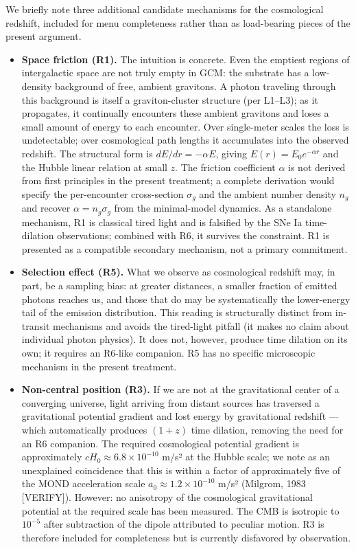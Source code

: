 \documentclass[12pt]{article}
\theoremstyle{definition}
\theoremstyle{remark}
\begin{document}
We briefly note three additional candidate mechanisms for the
cosmological redshift, included for menu completeness rather than as
load-bearing pieces of the present argument.

\begin{itemize}
\item
  \textbf{Space friction (R1).} The intuition is concrete. Even the
  emptiest regions of intergalactic space are not truly empty in GCM:
  the substrate has a low-density background of free, ambient gravitons.
  A photon traveling through this background is itself a graviton-cluster
  structure (per L1--L3); as it propagates, it continually encounters
  these ambient gravitons and loses a small amount of energy to each
  encounter. Over single-meter scales the loss is undetectable; over
  cosmological path lengths it accumulates into the observed redshift.
  The structural form is \(dE/dr = -\alpha E\), giving
  \(E(r) = E_0 e^{-\alpha r}\) and the Hubble linear relation at small
  \(z\). The friction coefficient \(\alpha\) is not derived from first
  principles in the present treatment; a complete derivation would
  specify the per-encounter cross-section \(\sigma_g\) and the ambient
  number density \(n_g\) and recover \(\alpha = n_g \sigma_g\) from the
  minimal-model dynamics. As a standalone mechanism, R1 is classical
  tired light and is falsified by the SNe Ia time-dilation observations;
  combined with R6, it survives the constraint. R1 is presented as a
  compatible secondary mechanism, not a primary commitment.
\item
  \textbf{Selection effect (R5).} What we observe as cosmological
  redshift may, in part, be a sampling bias: at greater distances, a
  smaller fraction of emitted photons reaches us, and those that do may
  be systematically the lower-energy tail of the emission distribution.
  This reading is structurally distinct from in-transit mechanisms and
  avoids the tired-light pitfall (it makes no claim about individual
  photon physics). It does not, however, produce time dilation on its
  own; it requires an R6-like companion. R5 has no specific microscopic
  mechanism in the present treatment.
\item
  \textbf{Non-central position (R3).} If we are not at the gravitational
  center of a converging universe, light arriving from distant sources
  has traversed a gravitational potential gradient and lost energy by
  gravitational redshift --- which automatically produces \((1+z)\) time
  dilation, removing the need for an R6 companion. The required
  cosmological potential gradient is approximately
  \(cH_0 \approx 6.8 \times 10^{-10}\) m/s² at the Hubble scale; we note
  as an unexplained coincidence that this is within a factor of
  approximately five of the MOND acceleration scale
  \(a_0 \approx 1.2 \times 10^{-10}\) m/s² (Milgrom, 1983 {[}VERIFY{]}).
  However: no anisotropy of the cosmological gravitational potential at
  the required scale has been measured. The CMB is isotropic to
  \(10^{-5}\) after subtraction of the dipole attributed to peculiar
  motion. R3 is therefore included for completeness but is currently
  disfavored by observation.
\end{itemize}
\end{document}
